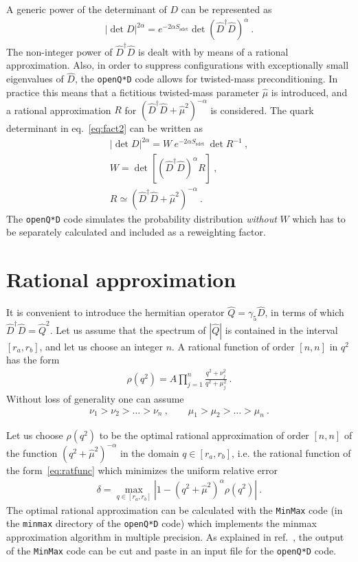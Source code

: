 \documentclass[11pt,fleqn]{article}
\newcommand{\Rmu}{R}
\begin{document}
A generic power of the determinant of $D$ can be represented as
\begin{gather}
   | \det D |^{2\alpha} = e^{- 2 \alpha S_\text{sdet}} \det (\hat{D}^\dag \hat{D})^\alpha \ .
   \label{eq:fact2}
\end{gather}
The non-integer power of $\hat{D}^\dag \hat{D}$ is dealt with by means of a rational approximation. Also, in order to suppress configurations with exceptionally small eigenvalues of $\hat{D}$, the \texttt{openQ*D} code allows for twisted-mass preconditioning. In practice this means that a fictitious twisted-mass parameter $\hat{\mu}$ is introduced, and a rational approximation $\Rmu$ for $( \hat{D}^\dag \hat{D} + \hat{\mu}^2 )^{-\alpha}$ is considered. The quark determinant in eq.~\eqref{eq:fact2} can be written as
\begin{gather}
   | \det D |^{2\alpha}
   =
   W \ e^{- 2 \alpha S_\text{sdet}} \ \det \Rmu^{-1} \ ,
   \label{eq:fact3}
   \\
   W = \det [ ( \hat{D}^\dag \hat{D})^\alpha \Rmu ]
   \ , \label{eq:W}
   \\
   \Rmu \simeq ( \hat{D}^\dag \hat{D} + \hat{\mu}^2 )^{-\alpha}
   \ .
\end{gather}
The \texttt{openQ*D} code simulates the probability distribution \textit{without} $W$ which has to be separately calculated and included as a reweighting factor.


\section{Rational approximation}
\label{sec:ratapprox}

It is convenient to introduce the hermitian operator $\hat{Q}=\gamma_5 \hat{D}$, in terms of which $\hat{D}^\dag \hat{D} = \hat{Q}^2$. Let us assume that the spectrum of $|\hat{Q}|$ is contained in the interval $[r_a,r_b]$, and let us choose an integer $n$. A rational function of order $[n,n]$ in $q^2$ has the form
\begin{gather}
   \rho(q^2) = A \prod_{j=1}^n \frac{q^2 + \nu_j^2}{q^2 + \mu_j^2} \ .
   \label{eq:ratfunc}
\end{gather}
Without loss of generality one can assume
\begin{gather}
   \nu_1 > \nu_2 > \dots > \nu_n \ , \qquad
   \mu_1 > \mu_2 > \dots > \mu_n \ .
\end{gather}

Let us choose $\rho(q^2)$ to be the optimal rational approximation of order $[n,n]$ of the function $(q^2 + \hat{\mu}^2)^{-\alpha}$ in the domain $q \in [r_a,r_b]$, i.e. the rational function of the form~\eqref{eq:ratfunc} which minimizes the uniform relative error
\begin{gather}
   \delta = \max_{q \in [r_a,r_b]} | 1 - (q^2 + \hat{\mu}^2)^{\alpha} \rho(q^2) |
   \ .
   \label{eq:error}
\end{gather}
The optimal rational approximation can be calculated with the \texttt{MinMax} code (in the \texttt{minmax} directory of the \texttt{openQ*D} code) which implements the minmax approximation algorithm in multiple precision. As explained in ref.~\cite{parms}, the output of the \texttt{MinMax} code can be cut and paste in an input file for the \texttt{openQ*D} code.
\end{document}
